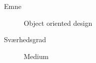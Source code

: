 \begin{description}
\item[Emne] Object oriented design
\item[Sværhedsgrad] Medium
\end{description}
